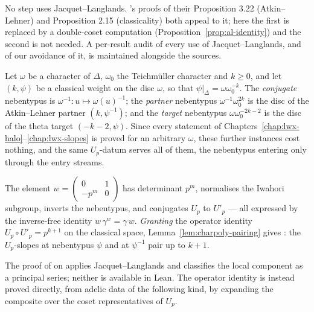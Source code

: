 No step uses Jacquet--Langlands.  \cite{LWX}'s proofs of their Proposition 3.22 (Atkin--Lehner)
and Proposition 2.15 (classicality) both appeal to it; here the first is replaced by a
double-coset computation (Proposition~\ref{prop:al-identity}) and the second is not needed.  A
per-result audit of every use of Jacquet--Langlands, and of our avoidance of it, is maintained
alongside the sources.

\begin{definition}
  \label{def:conjchar}
  \leanok
  Let $\omega$ be a character of $\Delta$, $\omega_0$ the Teichm\"uller character and $k \geq 0$,
  and let $(k,\psi)$ be a classical weight on the disc $\omega$, so that
  $\psi|_\Delta = \omega\omega_0^{-k}$.  The \emph{conjugate} nebentypus is
  $\omega^{-1} : u \mapsto \omega(u)^{-1}$; the \emph{partner} nebentypus
  $\omega^{-1}\omega_0^{2k}$ is the disc of the Atkin--Lehner partner $(k,\psi^{-1})$; and the
  \emph{target} nebentypus $\omega\omega_0^{-2k-2}$ is the disc of the theta target
  $(-k-2,\psi)$.  Since every statement of Chapters~\ref{chap:lwx-halo}--\ref{chap:lwx-slopes} is
  proved for an arbitrary $\omega$, these further instances cost nothing, and the same $U_p$-datum
  serves all of them, the nebentypus entering only through the entry streams.
\end{definition}

\begin{proposition}
  \label{prop:atkin-lehner}
  \leanok
  The element $w = \begin{pmatrix}0&1\\-p^{m}&0\end{pmatrix}$ has determinant $p^{m}$, normalises
  the Iwahori subgroup, inverts the nebentypus, and conjugates $U_p$ to $U'_p$ --- all expressed
  by the inverse-free identity $w\,\gamma^{w} = \gamma\,w$.  \emph{Granting} the operator
  identity $U_p\circ U'_p = p^{k+1}$ on the classical space,
  Lemma~\ref{lem:charpoly-pairing} gives \cite[Proposition 3.22]{LWX}: the $U_p$-slopes at
  nebentypus $\psi$ and at $\psi^{-1}$ pair up to $k+1$.
\end{proposition}

The proof of \cite[Proposition 3.22]{LWX} on \cite[p.~24]{LWX} applies Jacquet--Langlands and
classifies the local component as a principal series; neither is available in Lean.  The operator
identity is instead proved directly, from adelic data of the following kind, by expanding the
composite over the coset representatives of $U_p$.

